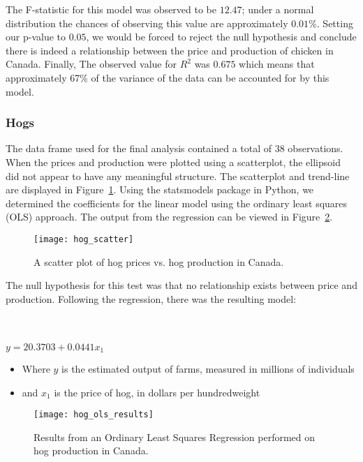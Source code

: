 The F-statistic for this model was observed to be $12.47$; under a normal distribution the chances of observing this value are approximately $0.01\%$.
Setting our p-value to $0.05$, we would be forced to reject the null hypothesis and conclude there is indeed a relationship between the price and production of chicken in Canada.
Finally, The observed value for $R^2$ was $0.675$ which means that approximately 67\% of the variance of the data can be accounted for by this model.

\subsubsection{Hogs}

The data frame used for the final analysis contained a total of 38 observations.
When the prices and production were plotted using a scatterplot, the ellipsoid did not appear to have any meaningful structure.
The scatterplot and trend-line are displayed in Figure~\ref{fig:hog_scatter}.
Using the statsmodels package in Python, we determined the coefficients for the linear model using the ordinary least squares (OLS) approach.
The output from the regression can be viewed in Figure~\ref{fig:hog_ols}.

\begin{figure}
    \texttt{[image: hog\_scatter]}
    \caption{A scatter plot of hog prices vs. hog production in Canada.}
    \label{fig:hog_scatter}
\end{figure}

The null hypothesis for this test was that no relationship exists between price and production.
Following the regression, there was the resulting model:

\\~\\

\tabto{5cm} $y = 20.3703 + 0.0441x_1$

\begin{itemize}
    \item Where $y$ is the estimated output of farms, measured in millions of individuals
    \item and $x_1$ is the price of hog, in dollars per hundredweight
\end{itemize}

\begin{figure}
    \texttt{[image: hog\_ols\_results]}
    \caption{Results from an Ordinary Least Squares Regression performed on hog production in Canada.}
    \label{fig:hog_ols}
\end{figure}


